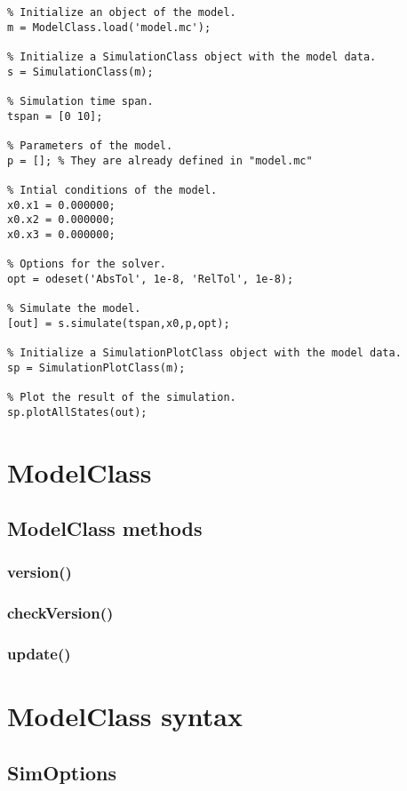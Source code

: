 \documentclass[11pt]{article}
\begin{document}
\begin{lstlisting}
% Initialize an object of the model.
m = ModelClass.load('model.mc');

% Initialize a SimulationClass object with the model data.
s = SimulationClass(m);

% Simulation time span.
tspan = [0 10];

% Parameters of the model.
p = []; % They are already defined in "model.mc"

% Intial conditions of the model.
x0.x1 = 0.000000;
x0.x2 = 0.000000;
x0.x3 = 0.000000;

% Options for the solver.
opt = odeset('AbsTol', 1e-8, 'RelTol', 1e-8);

% Simulate the model.
[out] = s.simulate(tspan,x0,p,opt);

% Initialize a SimulationPlotClass object with the model data.
sp = SimulationPlotClass(m);

% Plot the result of the simulation.
sp.plotAllStates(out);
\end{lstlisting}

\section{ModelClass}

\subsection{ModelClass methods}

\subsubsection{version()}

\subsubsection{checkVersion()}

\subsubsection{update()}

\section{ModelClass syntax}

\subsection{SimOptions}
\end{document}
